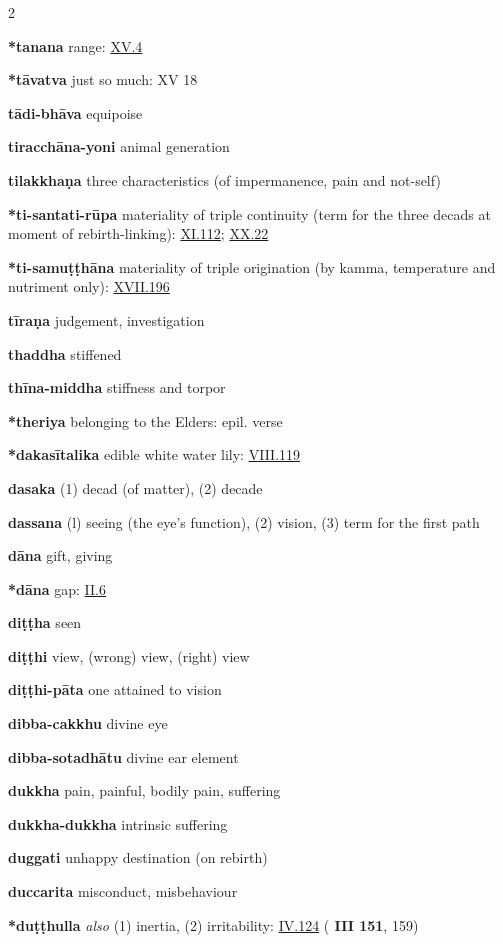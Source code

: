 \begin{multicols}{2}
\begin{vismHanging}
\par\textbf{*tanana} range: \hyperlink{XV.4}{XV.4}{}
\par\textbf{*tāvatva} just so much: XV 18
\par\textbf{tādi-bhāva} equipoise
\par\textbf{tiracchāna-yoni} animal generation
\par\textbf{tilakkhaṇa} three characteristics (of impermanence, pain and not-self) 
\par\textbf{*ti-santati-rūpa} materiality of triple continuity (term for the three decads at moment of rebirth-linking): \hyperlink{XI.112}{XI.112}{}; \hyperlink{XX.22}{XX.22}{} 
\par\textbf{*ti-samuṭṭhāna} materiality of triple origination (by kamma, temperature and nutriment only): \hyperlink{XVII.196}{XVII.196}{} 
\par\textbf{tīraṇa} judgement, investigation
\par\textbf{thaddha} stiffened
\par\textbf{thīna-middha} stiffness and torpor 
\par\textbf{*theriya} belonging to the Elders: epil. verse 
\par\textbf{*dakasītalika} edible white water lily: \hyperlink{VIII.119}{VIII.119}{} 
\par\textbf{dasaka} (1) decad (of matter), (2) decade
\par\textbf{dassana} (l) seeing (the eye’s function), (2) vision, (3) term for the first path 
\par\textbf{dāna} gift, giving 
\par\textbf{*dāna} gap: \hyperlink{II.6}{II.6}{}
\par\textbf{diṭṭha} seen
\par\textbf{diṭṭhi} view, (wrong) view, (right) view
\par\textbf{diṭṭhi-pāta} one attained to vision
\par\textbf{dibba-cakkhu} divine eye
\par\textbf{dibba-sotadhātu} divine ear element
\par\textbf{dukkha} pain, painful, bodily pain, suffering 
\par\textbf{dukkha-dukkha} intrinsic suffering
\par\textbf{duggati} unhappy destination (on rebirth) 
\par\textbf{duccarita} misconduct, misbehaviour
\par\textbf{*duṭṭhulla} \emph{also }(1) inertia, (2) irritability: \hyperlink{IV.124}{IV.124}{} (\textbf{\cite{M} III 151}, 159) 

\end{vismHanging}
\end{multicols}
